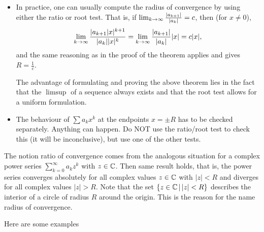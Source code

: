 \documentclass[10pt, a4paper]{article}
\newcommand{\infsumo}[1][k = 0]{\sum_{#1}^{\infty}}
\begin{document}
\begin{remark}\phantom{}
    \begin{itemize}
        \item In practice,
        one can usually compute the radius of convergence by using either the ratio or root test.
        That is,
        if $\liminfty[k]\frac{|a_{k + 1}|}{|a_k|} = c$,
        then (for $x \neq 0$),
        \[
        \liminfty[k]\frac{|a_{k + 1}|x| ^ {k + 1}}{|a_k||x| ^ k} = \liminfty[k]\frac{|a_{k + 1}|}{|a_k|}|x| = c|x|,
        \]
        and the same reasoning as in the proof of the theorem applies and gives $R = \frac{1}{c}$.

        The advantage of formulating and proving the above theorem lies in the fact that the $\limsup$ of a sequence always exists and that the root test allows for a uniform formulation.

        \item The behaviour of $\sum a_kx ^ k$ at the endpoints $x = \pm R$ has to be checked separately.
        Anything can happen.
        Do NOT use the ratio/root test to check this
        (it will be inconclusive),
        but use one of the other tests.
    \end{itemize}
\end{remark}

\begin{remark}
    The notion ratio of convergence comes from the analogous situation for a complex power series $\infsumo a_kz ^ k$ with $z \in \C$.
    Then same result holds,
    that is,
    the power series converges absolutely for all complex values $z \in \C$ with $|z| < R$ and diverges for all complex values $|z| > R$.
    Note that the set $\{z \in \C\,|\, |z| < R\}$ describes the interior of a circle of radius $R$ around the origin.
    This is the reason for the name radius of convergence.
\end{remark}

Here are some examples
\end{document}
